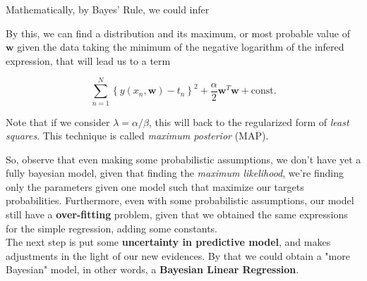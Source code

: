 \begin{frame}{\insertsubsection}
Mathematically, by Bayes' Rule, we could infer
\end{frame}

\begin{frame}{\insertsubsection}
By this, we can find a distribution and its maximum, or most probable value of $\mathbf{w}$ given the data taking the minimum of the negative logarithm of the infered expression, that will lead us to a term

\begin{equation*}
\sum^N_{n=1} \left\{ y(x_n, \mathbf{w}) - t_n \right\}^2 + \frac{\alpha}{2} \mathbf{w}^T\mathbf{w} + \text{const.}
\end{equation*}

Note that if we consider $\lambda = \alpha / \beta$, this will back to the regularized form of \textit{least squares}. This technique is called \textit{maximum posterior} (MAP).
\end{frame}

\begin{frame}{\insertsubsection}

So, observe that even making some probabilistic assumptions, we don't have yet a fully bayesian model, given that finding the \textit{maximum likelihood}, we're finding only the parameters given one model such that maximize our targets probabilities. Furthermore, even with some probabilistic assumptions, our model still have a \textbf{over-fitting} problem, given that we obtained the same expressions for the simple regression, adding some constants.\\
\vspace{1em}
The next step is put some \textbf{uncertainty in predictive model}, and makes adjustments in the light of our new evidences. By that we could obtain a "more Bayesian" model, in other words, a \textcolor{UniGold}{\textbf{Bayesian Linear Regression}}.

\end{frame}

